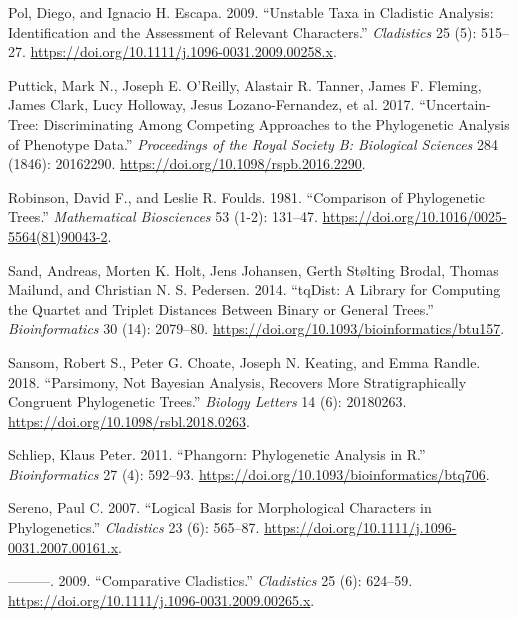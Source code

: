 \begin{CSLReferences}{1}{0}
\leavevmode{}%
Pol, Diego, and Ignacio H. Escapa. 2009. {``Unstable Taxa in Cladistic Analysis: Identification and the Assessment of Relevant Characters.''} \emph{Cladistics} 25 (5): 515--27. \url{https://doi.org/10.1111/j.1096-0031.2009.00258.x}.

\leavevmode{}%
Puttick, Mark N., Joseph E. O'Reilly, Alastair R. Tanner, James F. Fleming, James Clark, Lucy Holloway, Jesus Lozano-Fernandez, et al. 2017. {``Uncertain-Tree: Discriminating Among Competing Approaches to the Phylogenetic Analysis of Phenotype Data.''} \emph{Proceedings of the Royal Society B: Biological Sciences} 284 (1846): 20162290. \url{https://doi.org/10.1098/rspb.2016.2290}.

\leavevmode{}%
Robinson, David F., and Leslie R. Foulds. 1981. {``Comparison of Phylogenetic Trees.''} \emph{Mathematical Biosciences} 53 (1-2): 131--47. \url{https://doi.org/10.1016/0025-5564(81)90043-2}.

\leavevmode{}%
Sand, Andreas, Morten K. Holt, Jens Johansen, Gerth Stølting Brodal, Thomas Mailund, and Christian N. S. Pedersen. 2014. {``{tqDist}: A Library for Computing the Quartet and Triplet Distances Between Binary or General Trees.''} \emph{Bioinformatics} 30 (14): 2079--80. \url{https://doi.org/10.1093/bioinformatics/btu157}.

\leavevmode{}%
Sansom, Robert S., Peter G. Choate, Joseph N. Keating, and Emma Randle. 2018. {``Parsimony, Not {Bayesian} Analysis, Recovers More Stratigraphically Congruent Phylogenetic Trees.''} \emph{Biology Letters} 14 (6): 20180263. \url{https://doi.org/10.1098/rsbl.2018.0263}.

\leavevmode{}%
Schliep, Klaus Peter. 2011. {``Phangorn: Phylogenetic Analysis in {R}.''} \emph{Bioinformatics} 27 (4): 592--93. \url{https://doi.org/10.1093/bioinformatics/btq706}.

\leavevmode{}%
Sereno, Paul C. 2007. {``Logical Basis for Morphological Characters in Phylogenetics.''} \emph{Cladistics} 23 (6): 565--87. \url{https://doi.org/10.1111/j.1096-0031.2007.00161.x}.

\leavevmode{}%
---------. 2009. {``Comparative Cladistics.''} \emph{Cladistics} 25 (6): 624--59. \url{https://doi.org/10.1111/j.1096-0031.2009.00265.x}.


\end{CSLReferences}
